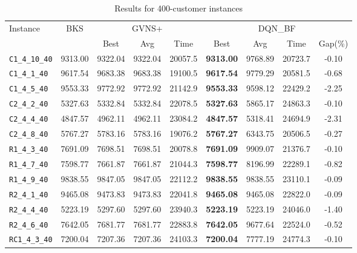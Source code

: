 \begin{table}[ht]
\centering
\small
\setlength{\tabcolsep}{5pt}
\caption{Results for 400-customer instances}
\vspace{4mm}
\begin{adjustbox}{width=\textwidth}
\begin{tabular}{l c c c c @{\hspace{8pt}} c c c c @{\hspace{8pt}}}
\toprule
\multirow{2}{*}{Instance} & \multirow{2}{*}{BKS} & \multicolumn{3}{c}{GVNS+} & \multicolumn{4}{c}{DQN\_BF} \\
\cmidrule(lr){3-5} \cmidrule(lr){6-9}
 &  & Best & Avg & Time & Best & Avg & Time & Gap(\%) \\
\midrule
\texttt{C1\_4\_10\_40} & 9313.00 & 9322.04 & 9322.04 & 20057.5 & \textbf{9313.00} & 9768.89 & 20723.7 & -0.10 \\
\texttt{C1\_4\_1\_40} & 9617.54 & 9683.38 & 9683.38 & 19100.5 & \textbf{9617.54} & 9779.29 & 20581.5 & -0.68 \\
\texttt{C1\_4\_5\_40} & 9553.33 & 9772.92 & 9772.92 & 21142.9 & \textbf{9553.33} & 9598.12 & 22429.2 & -2.25 \\
\texttt{C2\_4\_2\_40} & 5327.63 & 5332.84 & 5332.84 & 22078.5 & \textbf{5327.63} & 5865.17 & 24863.3 & -0.10 \\
\texttt{C2\_4\_4\_40} & 4847.57 & 4962.11 & 4962.11 & 23084.2 & \textbf{4847.57} & 5318.41 & 24694.9 & -2.31 \\
\texttt{C2\_4\_8\_40} & 5767.27 & 5783.16 & 5783.16 & 19076.2 & \textbf{5767.27} & 6343.75 & 20506.5 & -0.27 \\
\texttt{R1\_4\_3\_40} & 7691.09 & 7698.51 & 7698.51 & 20078.8 & \textbf{7691.09} & 9909.07 & 21376.7 & -0.10 \\
\texttt{R1\_4\_7\_40} & 7598.77 & 7661.87 & 7661.87 & 21044.3 & \textbf{7598.77} & 8196.99 & 22289.1 & -0.82 \\
\texttt{R1\_4\_9\_40} & 9838.55 & 9847.05 & 9847.05 & 22112.2 & \textbf{9838.55} & 9838.55 & 23110.1 & -0.09 \\
\texttt{R2\_4\_1\_40} & 9465.08 & 9473.83 & 9473.83 & 22041.8 & \textbf{9465.08} & 9465.08 & 22822.0 & -0.09 \\
\texttt{R2\_4\_4\_40} & 5223.19 & 5297.60 & 5297.60 & 23940.3 & \textbf{5223.19} & 5223.19 & 24046.0 & -1.40 \\
\texttt{R2\_4\_6\_40} & 7642.05 & 7681.77 & 7681.77 & 22883.8 & \textbf{7642.05} & 9677.64 & 22524.0 & -0.52 \\
\texttt{RC1\_4\_3\_40} & 7200.04 & 7207.36 & 7207.36 & 24103.3 & \textbf{7200.04} & 7777.19 & 24774.3 & -0.10 \\

\end{tabular}
\end{adjustbox}
\end{table}

